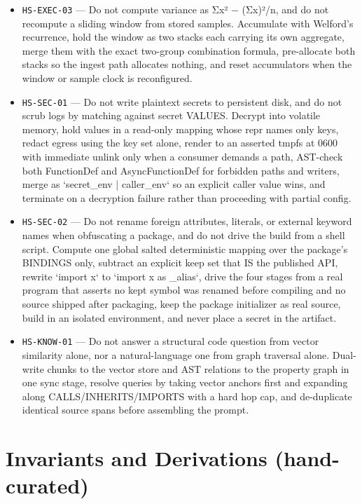 \documentclass[11pt]{article}
\begin{document}
\begin{itemize}
  \item \texttt{HS-EXEC-03} --- Do not compute variance as Σx² − (Σx)²/n, and do not recompute a sliding window from stored samples. Accumulate with Welford's recurrence, hold the window as two stacks each carrying its own aggregate, merge them with the exact two-group combination formula, pre-allocate both stacks so the ingest path allocates nothing, and reset accumulators when the window or sample clock is reconfigured. %
  \item \texttt{HS-SEC-01} --- Do not write plaintext secrets to persistent disk, and do not scrub logs by matching against secret VALUES. Decrypt into volatile memory, hold values in a read-only mapping whose repr names only keys, redact egress using the key set alone, render to an asserted tmpfs at 0600 with immediate unlink only when a consumer demands a path, AST-check both FunctionDef and AsyncFunctionDef for forbidden paths and writers, merge as `secret\_env | caller\_env` so an explicit caller value wins, and terminate on a decryption failure rather than proceeding with partial config. %
  \item \texttt{HS-SEC-02} --- Do not rename foreign attributes, literals, or external keyword names when obfuscating a package, and do not drive the build from a shell script. Compute one global salted deterministic mapping over the package's BINDINGS only, subtract an explicit keep set that IS the published API, rewrite `import x` to `import x as \_alias`, drive the four stages from a real program that asserts no kept symbol was renamed before compiling and no source shipped after packaging, keep the package initializer as real source, build in an isolated environment, and never place a secret in the artifact. %
  \item \texttt{HS-KNOW-01} --- Do not answer a structural code question from vector similarity alone, nor a natural-language one from graph traversal alone. Dual-write chunks to the vector store and AST relations to the property graph in one sync stage, resolve queries by taking vector anchors first and expanding along CALLS/INHERITS/IMPORTS with a hard hop cap, and de-duplicate identical source spans before assembling the prompt. %
\end{itemize}

\section{Invariants and Derivations (hand-curated)}
\end{document}
